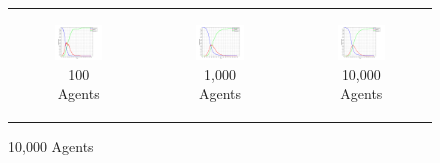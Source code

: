 \begin{figure}
\begin{center}
	\begin{tabular}{c c c}
		\begin{subfigure}[b]{0.3\textwidth}
			\centering
			\includegraphics[width=.7\textwidth, angle=0]{./../shared/fig/frabs/SIR_100agents_150t_01dt_parallel.png}
			\caption{100 Agents}
			\label{fig:pd_seq}
		\end{subfigure}
    	&
		\begin{subfigure}[b]{0.3\textwidth}
			\centering
			\includegraphics[width=.7\textwidth, angle=0]{./../shared/fig/frabs/SIR_1000agents_150t_01dt_parallel.png}
			\caption{1,000 Agents}
			\label{fig:pd_seq}
		\end{subfigure}
    	&
		\begin{subfigure}[b]{0.3\textwidth}
			\centering
			\includegraphics[width=.7\textwidth, angle=0]{./../shared/fig/frabs/SIR_10000agents_150t_01dt_parallel.png}
			\caption{10,000 Agents}
			\label{fig:hac_seq}
		\end{subfigure}
	\end{tabular}
	

\end{center}
\end{figure}
